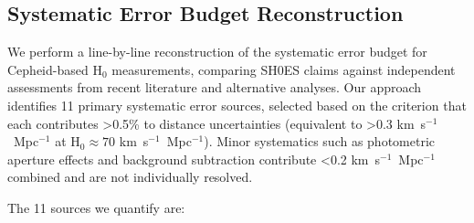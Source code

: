 \documentclass[twocolumn, linenumbers]{aastex701}
\begin{document}
\subsection{Systematic Error Budget Reconstruction} \label{sec:methods_budget}

We perform a line-by-line reconstruction of the systematic error budget for Cepheid-based H$_0$ measurements, comparing SH0ES claims \citep{Riess2022} against independent assessments from recent literature and alternative analyses. Our approach identifies 11 primary systematic error sources, selected based on the criterion that each contributes >0.5\% to distance uncertainties (equivalent to >0.3 km~s$^{-1}$~Mpc$^{-1}$ at H$_0 \approx 70$ km~s$^{-1}$~Mpc$^{-1}$). Minor systematics such as photometric aperture effects and background subtraction contribute <0.2 km~s$^{-1}$~Mpc$^{-1}$ combined and are not individually resolved.

The 11 sources we quantify are:
\end{document}
